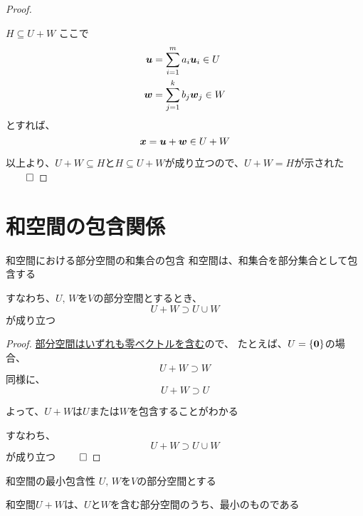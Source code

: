 \documentclass[../../../topic_linear-algebra]{subfiles}
\begin{document}
\begin{proof}
\begin{subpattern}{$H \subseteq U + W$}
    ここで
    \begin{align*}
      \vb*{u} & = \sum_{i=1}^m a_i \vb*{u}_i \in U \\
      \vb*{w} & = \sum_{j=1}^k b_j \vb*{w}_j \in W
    \end{align*}
    とすれば、
    \begin{equation*}
      \vb*{x} = \vb*{u} + \vb*{w} \in U + W
    \end{equation*}
  \end{subpattern}

  \br

  以上より、$U+W \subseteq H$と$H \subseteq U + W$が成り立つので、$U + W = H$が示された $\qed$
\end{proof}

\sectionline
\section{和空間の包含関係}

\begin{theorem}{和空間における部分空間の和集合の包含}
  和空間は、和集合を部分集合として包含する

  すなわち、$U,\,W$を$V$の部分空間とするとき、
  \begin{equation*}
    U + W \supset U \cup W
  \end{equation*}
  が成り立つ
\end{theorem}

\begin{proof}
  \hyperref[thm:subspace-contains-zero]{部分空間はいずれも零ベクトルを含む}ので、
  たとえば、$U = \{ \vb*{0} \}$の場合、
  \begin{equation*}
    U + W \supset W
  \end{equation*}
  同様に、
  \begin{equation*}
    U + W \supset U
  \end{equation*}

  よって、$U+W$は$U$または$W$を包含することがわかる

  すなわち、
  \begin{equation*}
    U + W \supset U \cup W
  \end{equation*}
  が成り立つ $\qed$
\end{proof}

\sectionline

\begin{theorem}{和空間の最小包含性}
  $U,\,W$を$V$の部分空間とする

  和空間$U+W$は、$U$と$W$を含む部分空間のうち、最小のものである
\end{theorem}
\end{document}
